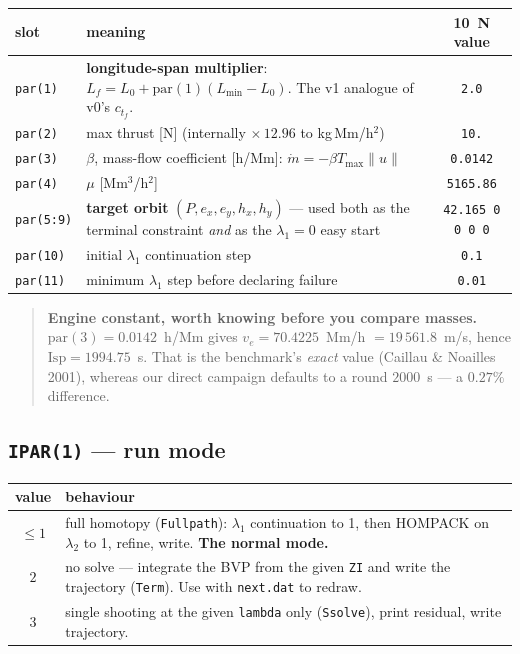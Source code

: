 \documentclass[11pt]{article}
\newcommand{\code}[1]{\texttt{\small #1}}
\newcommand{\file}[1]{\texttt{\small #1}}
\newcommand{\Tmax}{T_{\max}}
\newcommand{\Lf}{L_f}
\begin{document}
\begin{center}
\footnotesize
\begin{tabular}{@{}l p{10.4cm} c@{}}
\toprule
slot & meaning & 10~N value\\
\midrule
\code{par(1)} & \textbf{longitude-span multiplier}:
$\Lf = L_0 + \mathrm{par}(1)(L_{\min}-L_0)$. The v1 analogue of v0's
$c_{t_f}$. & \code{2.0}\\
\code{par(2)} & max thrust [N] (internally $\times\,12.96$ to kg\,Mm/h$^2$)
& \code{10.}\\
\code{par(3)} & $\beta$, mass-flow coefficient [h/Mm]:
$\dot m = -\beta\Tmax\|u\|$ & \code{0.0142}\\
\code{par(4)} & $\mu$ [Mm$^3$/h$^2$] & \code{5165.86}\\
\code{par(5:9)} & \textbf{target orbit} $(P, e_x, e_y, h_x, h_y)$ --- used both
as the terminal constraint \emph{and} as the $\lambda_1 = 0$ easy start &
\code{42.165 0 0 0 0}\\
\code{par(10)} & initial $\lambda_1$ continuation step & \code{0.1}\\
\code{par(11)} & minimum $\lambda_1$ step before declaring failure &
\code{0.01}\\
\bottomrule
\end{tabular}
\end{center}

\begin{quote}\small
\textbf{Engine constant, worth knowing before you compare masses.}
$\mathrm{par}(3) = 0.0142$~h/Mm gives $v_e = 70.4225$~Mm/h
$= 19\,561.8$~m/s, hence $\mathrm{Isp} = 1994.75$~s. That is the benchmark's
\emph{exact} value (Caillau \& Noailles 2001), whereas our direct campaign
defaults to a round $2000$~s --- a $0.27\%$ difference.
\end{quote}

\subsection{\code{IPAR(1)} --- run mode}

\begin{center}
\footnotesize
\begin{tabular}{@{}c p{14.2cm}@{}}
\toprule
value & behaviour\\
\midrule
$\le 1$ & full homotopy (\code{Fullpath}): $\lambda_1$ continuation to 1, then
HOMPACK on $\lambda_2$ to 1, refine, write. \textbf{The normal mode.}\\
$2$ & no solve --- integrate the BVP from the given \code{ZI} and write the
trajectory (\code{Term}). Use with \file{next.dat} to redraw.\\
$3$ & single shooting at the given \code{lambda} only (\code{Ssolve}), print
residual, write trajectory.\\
\bottomrule
\end{tabular}
\end{center}
\end{document}
